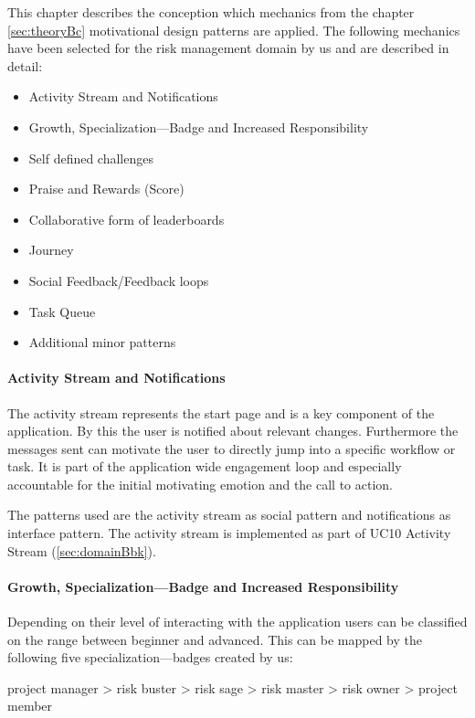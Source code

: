 This chapter describes the conception which mechanics from the chapter \ref{sec:theoryBc} motivational design patterns are applied.
The following mechanics have been selected for the risk management domain by us and are described in detail:
\begin{itemize}
	\item Activity Stream and Notifications
	\item Growth, Specialization—Badge and Increased Responsibility
	\item Self defined challenges
	\item Praise and Rewards (Score)
	\item Collaborative form of leaderboards
	\item Journey
	\item Social Feedback/Feedback loops
	\item Task Queue
	\item Additional minor patterns
\end{itemize}

\paragraph*{Activity Stream and Notifications}
The activity stream represents the start page and is a key component of the application. By this the user is notified about relevant changes. Furthermore the messages sent can motivate the user to directly jump into a specific workflow or task. 
It is part of the application wide engagement loop and especially accountable for the initial motivating emotion and the call to action.

The patterns used are the activity stream as social pattern and notifications as interface pattern.
The activity stream is implemented as part of \ac{UC}10 Activity Stream (\ref{sec:domainBbk}).

\paragraph*{Growth, Specialization—Badge and Increased Responsibility}

Depending on their level of interacting with the application users can be classified on the range between beginner and advanced. This can be mapped by the following five specialization—badges created by us:

project manager > risk buster > risk sage > risk master > risk owner > project member

